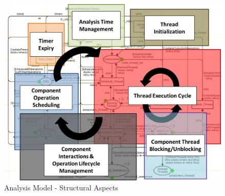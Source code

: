 \begin{figure}[h]
	\centering
        \includegraphics[width=\textwidth]{./Figures/hlcpn_structure}
	\caption{Analysis Model - Structural Aspects}
	\label{fig:hlcpn_structure}
\end{figure}

\fi
